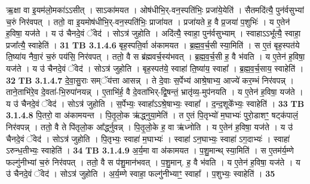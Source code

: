 \documentclass[17pt]{extarticle}
\begin{document}
{{                  ऋ॒क्षा वा इ॒यम॑लो॒मका॑ऽऽसीत् । साऽका॑मयत । ओष॑धीभि॒र्-वन॒स्पति॑भिः॒ प्रजा॑ये॒येति॑ । सैतमदि॑त्यै॒ पुन॑र्वसुभ्यां च॒रुं निर॑वपत् । ततो॒ वा इ॒यमोष॑धीभि॒र्-वन॒स्पति॑भिः॒ प्राजा॑यत । प्रजा॑यते ह॒ वै प्र॒जया॑ प॒शुभिः॑ । य ए॒तेन॑ ह॒विषा॒ यज॑ते । य उ॑ चैनदे॒वं ॅवेद॑ । सोऽत्र॑ जुहोति । अदि॑त्यै॒ स्वाहा॒ पुन॑र्वसुभ्याम् । स्वाहाऽऽभू᳚त्यै॒ स्वाहा॒ प्रजा᳚त्यै॒ स्वाहेति॑ । \textbf{ 31} \newline
                  \newline
                                \textbf{ TB 3.1.4.6} \newline
                  बृह॒स्पति॒र्वा अ॑कामयत । ब्र॒ह्म॒व॒र्च॒सी स्या॒मिति॑ । स ए॒तं बृह॒स्पत॑ये ति॒ष्या॑य नैवा॒रं च॒रुं पय॑सि॒ निर॑वपत् । ततो॒ वै स ब्र॑ह्मवर्च॒स्य॑भवत् । ब्र॒ह्म॒व॒र्च॒सी ह॒ वै भ॑वति । य ए॒तेन॑ ह॒विषा॒ यज॑ते । य उ॑ चैनदे॒वं ॅवेद॑ । सोऽत्र॑ जुहोति । बृह॒स्पत॑ये॒ स्वाहा॑ ति॒ष्या॑य॒ स्वाहा᳚ । ब्र॒ह्म॒व॒र्च॒साय॒ स्वाहेति॑ । \textbf{ 32} \newline
                  \newline
                                \textbf{ TB 3.1.4.7} \newline
                  दे॒वा॒सु॒राः सम्ॅय॑त्ता आसन्न् । ते दे॒वाः स॒र्पेभ्य॑ आश्रे॒षाभ्य॒ आज्ये॑ कर॒म्भं निर॑वपन्न् । ताने॒ताभि॑रे॒व दे॒वता॑-भि॒रुपा॑नयन्न् । ए॒ताभि॑र्ह॒ वै दे॒वता॑भिर्-द्वि॒षन्तं॒ भ्रातृ॑व्य॒-मुप॑नयति । य ए॒तेन॑ ह॒विषा॒ यज॑ते । य उ॑ चैनदे॒वं ॅवेद॑ । सोऽत्र॑ जुहोति । स॒र्पेभ्यः॒ स्वाहा᳚ऽऽश्रे॒षाभ्यः॒ स्वाहा᳚ । द॒न्द॒शूके᳚भ्यः॒ स्वाहेति॑ । \textbf{ 33} \newline
                  \newline
                                \textbf{ TB 3.1.4.8} \newline
                  पि॒तरो॒ वा अ॑कामयन्त । पि॒तृ॒लो॒क ऋ॑द्ध्नुया॒मेति॑ । त ए॒तं पि॒तृभ्यो॑ म॒घाभ्यः॑ पुरो॒डाशꣳ॒॒ षट्क॑पालं॒ निर॑वपन्न् । ततो॒ वै ते पि॑तृलो॒क आ᳚र्द्ध्नुवन्न् । पि॒तृ॒लो॒के ह॒ वा ऋ॑ध्नोति । य ए॒तेन॑ ह॒विषा॒ यज॑ते । य उ॑ चैनदे॒वं ॅवेद॑ । सोऽत्र॑ जुहोति । पि॒तृभ्यः॒ स्वाहा॑ म॒घाभ्यः॑ । स्वाहा॑ ऽन॒घाभ्यः॒ स्वाहा॑ ऽग॒दाभ्यः॑ । स्वाहा॑ ऽरुन्ध॒तीभ्यः॒ स्वाहेति॑ । \textbf{ 34} \newline
                  \newline
                                \textbf{ TB 3.1.4.9} \newline
                  अ॒र्य॒मा वा अ॑कामयत । प॒शु॒मान्थ् स्या॒मिति॑ । स ए॒तम॑र्य॒म्णे फल्गु॑नीभ्यां च॒रुं निर॑वपत् । ततो॒ वै स प॑शु॒मान॑भवत् । प॒शु॒मान्. ह॒ वै भ॑वति । य ए॒तेन॑ ह॒विषा॒ यज॑ते । य उ॑ चैनदे॒वं ॅवेद॑ । सोऽत्र॑ जुहोति । अ॒र्य॒म्णे स्वाहा॒ फल्गु॑नीभ्याꣳ॒॒ स्वाहा᳚ । प॒शुभ्यः॒ स्वाहेति॑ । \textbf{ 35} \newline
}}
\end{document}

